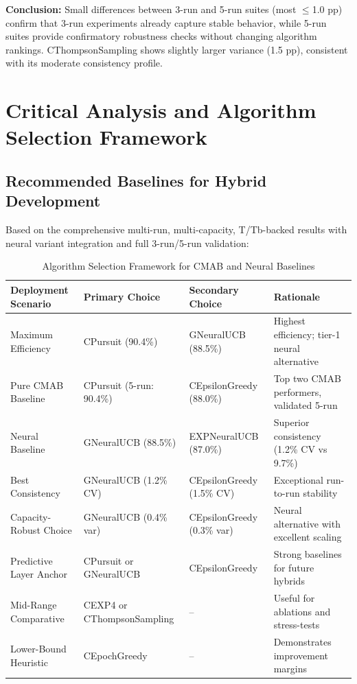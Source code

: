 \documentclass[12pt,a4paper]{article}
\begin{document}
\textbf{Conclusion:} Small differences between 3-run and 5-run suites (most $\leq$1.0 pp) confirm that 3-run experiments already capture stable behavior, while 5-run suites provide confirmatory robustness checks without changing algorithm rankings. CThompsonSampling shows slightly larger variance (1.5 pp), consistent with its moderate consistency profile.

\section{Critical Analysis and Algorithm Selection Framework}

\subsection{Recommended Baselines for Hybrid Development}

Based on the comprehensive multi-run, multi-capacity, T/Tb-backed results with neural variant integration and full 3-run/5-run validation:

\begin{table}[H]
\scriptsize
\centering
\caption{Algorithm Selection Framework for CMAB and Neural Baselines}
\begin{tabular}{|l|l|l|l|}
\hline
\textbf{Deployment Scenario} & \textbf{Primary Choice} & \textbf{Secondary Choice} & \textbf{Rationale} \\
\hline
\hline
Maximum Efficiency & CPursuit (90.4\%) & GNeuralUCB (88.5\%) & Highest efficiency; tier-1 neural alternative \\
Pure CMAB Baseline & CPursuit (5-run: 90.4\%) & CEpsilonGreedy (88.0\%) & Top two CMAB performers, validated 5-run \\
Neural Baseline & GNeuralUCB (88.5\%) & EXPNeuralUCB (87.0\%) & Superior consistency (1.2\% CV vs 9.7\%) \\
Best Consistency & GNeuralUCB (1.2\% CV) & CEpsilonGreedy (1.5\% CV) & Exceptional run-to-run stability \\
Capacity-Robust Choice & GNeuralUCB (0.4\% var) & CEpsilonGreedy (0.3\% var) & Neural alternative with excellent scaling \\
Predictive Layer Anchor & CPursuit or GNeuralUCB & CEpsilonGreedy & Strong baselines for future hybrids \\
Mid-Range Comparative & CEXP4 or CThompsonSampling & --           & Useful for ablations and stress-tests \\
Lower-Bound Heuristic & CEpochGreedy & --           & Demonstrates improvement margins \\
\hline
\end{tabular}
\end{table}
\end{document}
